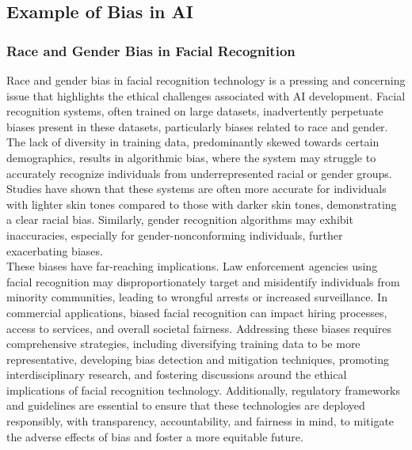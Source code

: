 \documentclass[12pt,a4paper,openright,twoside]{book}
\begin{document}
\subsection{Example of Bias in AI}
\subsubsection{Race and Gender Bias in Facial Recognition}
Race and gender bias in facial recognition technology is a pressing and concerning issue that highlights the ethical challenges associated with AI development. Facial recognition systems, often trained on large datasets, inadvertently perpetuate biases present in these datasets, particularly biases related to race and gender. The lack of diversity in training data, predominantly skewed towards certain demographics, results in algorithmic bias, where the system may struggle to accurately recognize individuals from underrepresented racial or gender groups. Studies have shown that these systems are often more accurate for individuals with lighter skin tones compared to those with darker skin tones, demonstrating a clear racial bias. Similarly, gender recognition algorithms may exhibit inaccuracies, especially for gender-nonconforming individuals, further exacerbating biases. \cite{https://doi.org/10.5281/zenodo.4050457} \\
These biases have far-reaching implications. Law enforcement agencies using facial recognition may disproportionately target and misidentify individuals from minority communities, leading to wrongful arrests or increased surveillance. In commercial applications, biased facial recognition can impact hiring processes, access to services, and overall societal fairness. Addressing these biases requires comprehensive strategies, including diversifying training data to be more representative, developing bias detection and mitigation techniques, promoting interdisciplinary research, and fostering discussions around the ethical implications of facial recognition technology. Additionally, regulatory frameworks and guidelines are essential to ensure that these technologies are deployed responsibly, with transparency, accountability, and fairness in mind, to mitigate the adverse effects of bias and foster a more equitable future.
\end{document}
